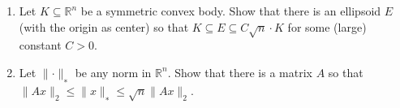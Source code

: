 \documentclass[11pt,a4paper]{article}
\renewcommand{\leq}{\leqslant}
\DeclareMathOperator{\conv}{conv}
\DeclareMathOperator{\cone}{cone}
\begin{document}
\begin{enumerate}
\begin{enumerate}[a)]
 \end{enumerate}
  
\item Let $K ⊆\mathbb{R}^n$ be a symmetric convex body. Show that there is an ellipsoid $E$ (with the origin as center) so that $K ⊆ E ⊆ C\sqrt{n}\cdot K$ for some (large) constant $C >0$.


\item Let $∥\cdot∥_∗$ be any norm in $\mathbb{R}^n$. Show that there is a matrix $A$ so that $∥Ax∥_2 \leq ∥x∥_∗ \leq \sqrt{n}∥Ax∥_2$.


\end{enumerate}


%
%


 
\end{document}

